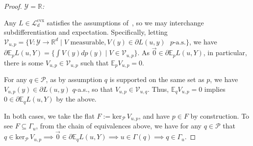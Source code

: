 \documentclass[11pt]{article} %
\newcommand{\Comments}{1}
\newcommand{\mynote}[2]{\ifnum\Comments=1\textcolor{#1}{#2}\fi}
\newcommand{\mytodo}[2]{\ifnum\Comments=1%
	\todo[linecolor=#1!80!black,backgroundcolor=#1,bordercolor=#1!80!black]{#2}\fi}
\newcommand{\jessie}[1]{\mynote{purple}{[JF: #1]}}
\newcommand{\btw}[1]{}%
\newcommand{\reals}{\mathbb{R}}
\newcommand{\supp}{\mathrm{supp}}
\newcommand{\zeros}[1]{\mathrm{ker}_\P\,#1}
\newcommand{\E}{\mathbb{E}}
\newcommand{\Lcvx}{\mathcal{L}^{\mathrm{cvx}}}
\renewcommand{\P}{\mathcal{P}}
\newcommand{\V}{\mathcal{V}}
\newcommand{\Y}{\mathcal{Y}}
\begin{document}
\begin{proof}
  \emph{$\Y=\reals$: }
  \btw{Note: this should work for any infinite $\Y$ so long as you have a good $\sigma$-algebra... working at least with $\Y \subseteq \reals$ just makes things easier since we can take the Borel $\sigma$-algebra for granted.}
  Any $L \in \Lcvx_d$ satisfies the assumptions of~\cite{ioffe1969minimization}, so we may interchange subdifferentiation and expectation.
  Specifically, letting $\V_{u,p} = \{V:\Y\to\reals^d \mid V \text{ measurable}, V(y) \in \partial L(u,y) \text{ $p$-a.s.}\}$, we have
  $\partial \E_p L(u,Y) = \{\int V(y)dp(y) \mid V\in\V_{u,p}\}$.
  As $\vec 0 \in \partial \E_p L(u,Y)$, in particular, there is some $V_{u,p} \in \V_{u,p}$ such that $\E_p V_{u,p} = 0$.
  \btw{Fleshing this out: $\exists E \subseteq \mathcal{B}(\Y)$ so that $p(E) = 0$ and $V(y) \in \partial L(u,y) \forall y \in E^c$.  Claim $q(E) = 0$, which would complete the claim that $V(y) \in \partial L(u,y) q$-a.s.  For contradiction, if $q(E) > 0$, then $\exists x \in E$ and open neighborhood $N_x \ni x$ with $q(N_x) > 0$.  Since $\supp(p) = \supp(q)$, we then have $p(N_x) >0$, contradicting $p(E) = 0$, and hence $V(y) \in \partial L(u,y)$ not $p$-a.s.  Therefore, we must have $q(E) = 0$, so $V(y) \in \partial L(u,y) q$-a.s.}
  For any $q\in\P$, as by assumption $q$ is supported on the same set as $p$, we have $V_{u,p}(y)\in\partial L(u,y)$ $q$-a.s., so that $V_{u,p}\in\V_{u,q}$\btw{I'm a bit too tired to see exactly how this follows, but it seems intuitively obvious. I'm okay to punt on it for the submission, but if someone has time to check, that would be great! \jessie{See above margin comment.  I think it's too much detail for the conference submission, but feel free to change my mind.}}.
  Thus, $\E_q V_{u,p} = 0$ implies $0\in\partial\E_q L(u,Y)$ by the above.
  \btw{For posterity, the bug: we want to conclude $\E_q V_{u,p} = 0 \implies q \in \Gamma_u$.  But the ``a.s.\ in $p$'' means we may not have $0 \in \partial \E_q L(u,Y)$, since maybe $V_{u,p}(y)$ is not in $\partial L(u,y)$ a.s.\ in $q$...}
  
  In both cases, we take the flat $F := \zeros{V_{u,p}}$, and have $p \in F$ by construction.
  To see $F \subseteq \Gamma_u$, from the chain of equivalences above, we have for any $q\in\P$ that $q \in \zeros{V_{u,p}} \implies \vec 0 \in \partial \E_q L(u,Y) \implies u \in \Gamma(q) \implies q \in \Gamma_u$.
\end{proof}

\end{document}
